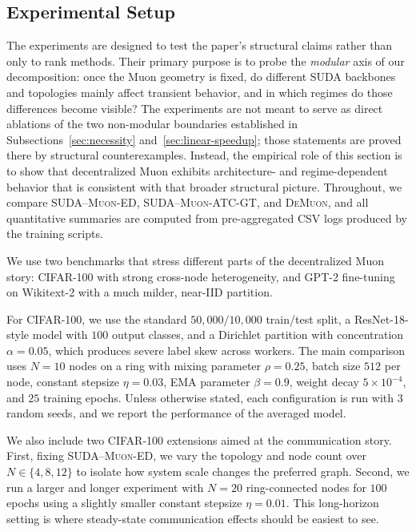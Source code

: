 \documentclass{article}
\begin{document}
\subsection{Experimental Setup}
\label{subsec:exp-setup}


The experiments are designed to test the paper's structural claims rather than
only to rank methods. Their primary purpose is to probe the \emph{modular}
axis of our decomposition: once the Muon geometry is fixed, do different SUDA
backbones and topologies mainly affect transient behavior, and in which
regimes do those differences become visible? The experiments are not meant to
serve as direct ablations of the two non-modular boundaries established in
Subsections~\ref{sec:necessity} and~\ref{sec:linear-speedup}; those statements
are proved there by structural counterexamples. Instead, the empirical role of
this section is to show that decentralized Muon exhibits architecture- and
regime-dependent behavior that is consistent with that broader structural
picture. Throughout, we compare \textsc{SUDA--Muon-ED},
\textsc{SUDA--Muon-ATC-GT}, and \textsc{DeMuon}, and all quantitative
summaries are computed from pre-aggregated CSV logs produced by the training
scripts.


We use two benchmarks that stress different parts of the decentralized Muon
story: CIFAR-100 with strong cross-node heterogeneity, and GPT-2 fine-tuning
on Wikitext-2 with a much milder, near-IID partition.



For CIFAR-100, we use the standard $50{,}000/10{,}000$ train/test split, a
ResNet-18-style model with $100$ output classes, and a Dirichlet partition
with concentration $\alpha = 0.05$, which produces severe label skew across
workers. The main comparison uses $N=10$ nodes on a ring with mixing parameter
$\rho = 0.25$, batch size $512$ per node, constant stepsize $\eta = 0.03$,
EMA parameter $\beta = 0.9$, weight decay $5\times 10^{-4}$, and $25$
training epochs. Unless otherwise stated, each configuration is run with $3$
random seeds, and we report the performance of the averaged model.



We also include two CIFAR-100 extensions aimed at the communication story.
First, fixing \textsc{SUDA--Muon-ED}, we vary the topology and node count over
$N \in \{4,8,12\}$ to isolate how system scale changes the preferred graph.
Second, we run a larger and longer experiment with $N=20$ ring-connected nodes
for $100$ epochs using a slightly smaller constant stepsize $\eta = 0.01$.
This long-horizon setting is where steady-state communication effects should be
easiest to see.
\end{document}
